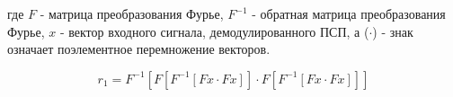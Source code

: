 где ${F}$ - матрица преобразования Фурье, ${F^{-1}}$ - обратная матрица преобразования Фурье, ${x}$ - вектор входного сигнала,
демодулированного ПСП, а (${\cdot{}}$) - знак означает поэлементное перемножение векторов.

\begin{center}
\begin{equation}
	r_1 = F^{-1} \left[ F\left[F^{-1}\left[Fx \cdot Fx\right]\right] \cdot F\left[F^{-1}\left[Fx \cdot Fx\right]\right] \right]
\end{equation}
\end{center}


\newpage
